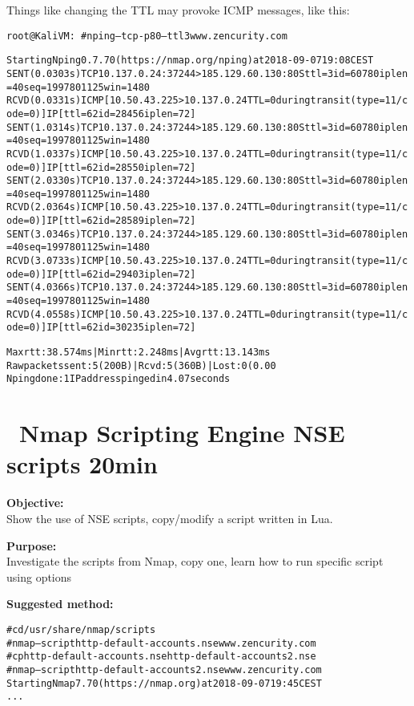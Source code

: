 \documentclass[a4paper,11pt,notitlepage]{report}
\begin{document}
Things like changing the TTL may provoke ICMP messages, like this:
\begin{alltt}\footnotesize
root@KaliVM:~# nping --tcp -p 80 --ttl 3 www.zencurity.com

Starting Nping 0.7.70 ( https://nmap.org/nping ) at 2018-09-07 19:08 CEST
SENT (0.0303s) TCP 10.137.0.24:37244 > 185.129.60.130:80 S ttl=3 id=60780 iplen=40  seq=1997801125 win=1480
RCVD (0.0331s) ICMP [10.50.43.225 > 10.137.0.24 TTL=0 during transit (type=11/code=0) ] IP [ttl=62 id=28456 iplen=72 ]
SENT (1.0314s) TCP 10.137.0.24:37244 > 185.129.60.130:80 S ttl=3 id=60780 iplen=40  seq=1997801125 win=1480
RCVD (1.0337s) ICMP [10.50.43.225 > 10.137.0.24 TTL=0 during transit (type=11/code=0) ] IP [ttl=62 id=28550 iplen=72 ]
SENT (2.0330s) TCP 10.137.0.24:37244 > 185.129.60.130:80 S ttl=3 id=60780 iplen=40  seq=1997801125 win=1480
RCVD (2.0364s) ICMP [10.50.43.225 > 10.137.0.24 TTL=0 during transit (type=11/code=0) ] IP [ttl=62 id=28589 iplen=72 ]
SENT (3.0346s) TCP 10.137.0.24:37244 > 185.129.60.130:80 S ttl=3 id=60780 iplen=40  seq=1997801125 win=1480
RCVD (3.0733s) ICMP [10.50.43.225 > 10.137.0.24 TTL=0 during transit (type=11/code=0) ] IP [ttl=62 id=29403 iplen=72 ]
SENT (4.0366s) TCP 10.137.0.24:37244 > 185.129.60.130:80 S ttl=3 id=60780 iplen=40  seq=1997801125 win=1480
RCVD (4.0558s) ICMP [10.50.43.225 > 10.137.0.24 TTL=0 during transit (type=11/code=0) ] IP [ttl=62 id=30235 iplen=72 ]

Max rtt: 38.574ms | Min rtt: 2.248ms | Avg rtt: 13.143ms
Raw packets sent: 5 (200B) | Rcvd: 5 (360B) | Lost: 0 (0.00%)
Nping done: 1 IP address pinged in 4.07 seconds
\end{alltt}



\chapter{\faInfoCircle\ Nmap Scripting Engine NSE scripts 20min}
\label{ex:nmap-nse}

{\bf Objective:} \\
Show the use of NSE scripts, copy/modify a script written in Lua.

{\bf Purpose:}\\
Investigate the scripts from Nmap, copy one, learn how to run specific script using options

{\bf Suggested method:}\\
\begin{alltt}
# cd /usr/share/nmap/scripts
# nmap --script http-default-accounts.nse www.zencurity.com
# cp http-default-accounts.nse http-default-accounts2.nse
# nmap --script http-default-accounts2.nse www.zencurity.com
Starting Nmap 7.70 ( https://nmap.org ) at 2018-09-07 19:45 CEST
...
\end{alltt}
\end{document}
